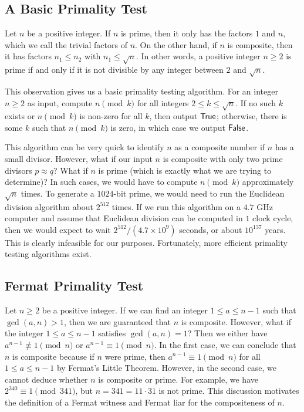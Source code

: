 \subsection{A Basic Primality Test}
Let $n$ be a positive integer. If $n$ is prime, then it only has the factors $1$ and $n$, which we call 
the trivial factors of $n$. On the other hand, if $n$ is composite, then it has factors 
$n_1 \leq n_2$ with $n_1 \leq \sqrt n$. In other words, a positive integer $n \geq 2$ is prime if and 
only if it is not divisible by any integer between $2$ and $\sqrt n$. 

This observation gives us a basic primality testing algorithm. For an integer $n \geq 2$ as input, 
compute $n \pmod k$ for all integers $2 \leq k \leq \sqrt n$. If no such $k$ exists or 
$n \pmod k$ is non-zero for all $k$, then output ${\sf True}$; otherwise, there is some $k$ such that 
$n \pmod k$ is zero, in which case we output ${\sf False}$. 

This algorithm can be very quick to identify $n$ as a composite number if $n$ has a small divisor. 
However, what if our input $n$ is composite with only two prime divisors $p \approx q$? 
What if $n$ is prime (which is exactly what we are trying to determine)? In such cases, 
we would have to compute $n \pmod k$ approximately $\sqrt n$ times. To generate a 
$1024$-bit prime, we would need to run the Euclidean division algorithm about $2^{512}$ times. 
If we run this algorithm on a $4.7$ GHz computer and assume that Euclidean division can be 
computed in $1$ clock cycle, then we would expect to wait $2^{512}/(4.7 \times 10^9)$ seconds, 
or about $10^{137}$ years. This is clearly infeasible for our purposes. Fortunately, 
more efficient primality testing algorithms exist. 

\subsection{Fermat Primality Test}
Let $n \geq 2$ be a positive integer. If we can find an integer $1 \leq a \leq n-1$ such that 
$\gcd(a, n) > 1$, then we are guaranteed that $n$ is composite. However, what if the integer 
$1 \leq a \leq n-1$ satisfies $\gcd(a, n) = 1$? Then we either have $a^{n-1} \not\equiv 1 \pmod n$ 
or $a^{n-1} \equiv 1 \pmod n$. In the first case, we can conclude that $n$ is composite because 
if $n$ were prime, then $a^{n-1} \equiv 1 \pmod n$ for all $1 \leq a \leq n-1$ by Fermat's Little 
Theorem. However, in the second case, we cannot deduce whether $n$ is composite or prime. 
For example, we have $2^{340} \equiv 1 \pmod{341}$, but $n = 341 = 11 \cdot 31$ is not prime. 
This discussion motivates the definition of a Fermat witness and Fermat liar for the compositeness of $n$.

